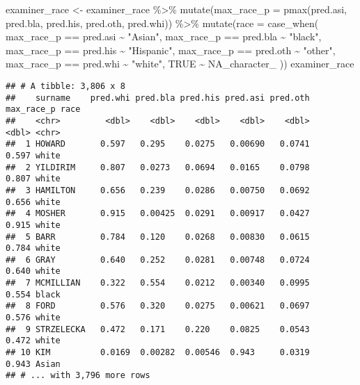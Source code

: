 \documentclass[
]{article}
\newenvironment{Shaded}{\begin{snugshade}}{\end{snugshade}}
\newcommand{\AttributeTok}[1]{\textcolor[rgb]{0.77,0.63,0.00}{#1}}
\newcommand{\ConstantTok}[1]{\textcolor[rgb]{0.00,0.00,0.00}{#1}}
\newcommand{\FunctionTok}[1]{\textcolor[rgb]{0.00,0.00,0.00}{#1}}
\newcommand{\NormalTok}[1]{#1}
\newcommand{\OtherTok}[1]{\textcolor[rgb]{0.56,0.35,0.01}{#1}}
\newcommand{\SpecialCharTok}[1]{\textcolor[rgb]{0.00,0.00,0.00}{#1}}
\newcommand{\StringTok}[1]{\textcolor[rgb]{0.31,0.60,0.02}{#1}}
\begin{document}
\begin{Shaded}
\begin{Highlighting}[]
\NormalTok{examiner\_race }\OtherTok{\textless{}{-}}\NormalTok{ examiner\_race }\SpecialCharTok{\%\textgreater{}\%} 
  \FunctionTok{mutate}\NormalTok{(}\AttributeTok{max\_race\_p =} \FunctionTok{pmax}\NormalTok{(pred.asi, pred.bla, pred.his, pred.oth, pred.whi)) }\SpecialCharTok{\%\textgreater{}\%} 
  \FunctionTok{mutate}\NormalTok{(}\AttributeTok{race =} \FunctionTok{case\_when}\NormalTok{(}
\NormalTok{    max\_race\_p }\SpecialCharTok{==}\NormalTok{ pred.asi }\SpecialCharTok{\textasciitilde{}} \StringTok{"Asian"}\NormalTok{,}
\NormalTok{    max\_race\_p }\SpecialCharTok{==}\NormalTok{ pred.bla }\SpecialCharTok{\textasciitilde{}} \StringTok{"black"}\NormalTok{,}
\NormalTok{    max\_race\_p }\SpecialCharTok{==}\NormalTok{ pred.his }\SpecialCharTok{\textasciitilde{}} \StringTok{"Hispanic"}\NormalTok{,}
\NormalTok{    max\_race\_p }\SpecialCharTok{==}\NormalTok{ pred.oth }\SpecialCharTok{\textasciitilde{}} \StringTok{"other"}\NormalTok{,}
\NormalTok{    max\_race\_p }\SpecialCharTok{==}\NormalTok{ pred.whi }\SpecialCharTok{\textasciitilde{}} \StringTok{"white"}\NormalTok{,}
    \ConstantTok{TRUE} \SpecialCharTok{\textasciitilde{}} \ConstantTok{NA\_character\_}
\NormalTok{  ))}
\NormalTok{examiner\_race}
\end{Highlighting}
\end{Shaded}

\begin{verbatim}
## # A tibble: 3,806 x 8
##    surname    pred.whi pred.bla pred.his pred.asi pred.oth max_race_p race 
##    <chr>         <dbl>    <dbl>    <dbl>    <dbl>    <dbl>      <dbl> <chr>
##  1 HOWARD       0.597   0.295    0.0275   0.00690   0.0741      0.597 white
##  2 YILDIRIM     0.807   0.0273   0.0694   0.0165    0.0798      0.807 white
##  3 HAMILTON     0.656   0.239    0.0286   0.00750   0.0692      0.656 white
##  4 MOSHER       0.915   0.00425  0.0291   0.00917   0.0427      0.915 white
##  5 BARR         0.784   0.120    0.0268   0.00830   0.0615      0.784 white
##  6 GRAY         0.640   0.252    0.0281   0.00748   0.0724      0.640 white
##  7 MCMILLIAN    0.322   0.554    0.0212   0.00340   0.0995      0.554 black
##  8 FORD         0.576   0.320    0.0275   0.00621   0.0697      0.576 white
##  9 STRZELECKA   0.472   0.171    0.220    0.0825    0.0543      0.472 white
## 10 KIM          0.0169  0.00282  0.00546  0.943     0.0319      0.943 Asian
## # ... with 3,796 more rows
\end{verbatim}
\end{document}
